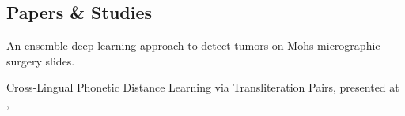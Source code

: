 \documentclass[letter, 14pt]{article}
\begin{document}
\subsection{Papers \& Studies}
\subtext{}
\begin{zitemize}
\item An ensemble deep learning approach to detect tumors on Mohs micrographic surgery slides. 
\href{https://arxiv.org/abs/2504.05219}{\color{black}{\externallink}}
\item Cross-Lingual Phonetic Distance Learning via Transliteration Pairs, presented at \href{https://siu2025.isikun.edu.tr/index_en.php}{\color{black}{IEEE SIU 2025 Conference}}, \href{https://ieeexplore.ieee.org/abstract/document/11112305}{\color{black}{paper \externallink}}

\end{zitemize}
\end{document}

